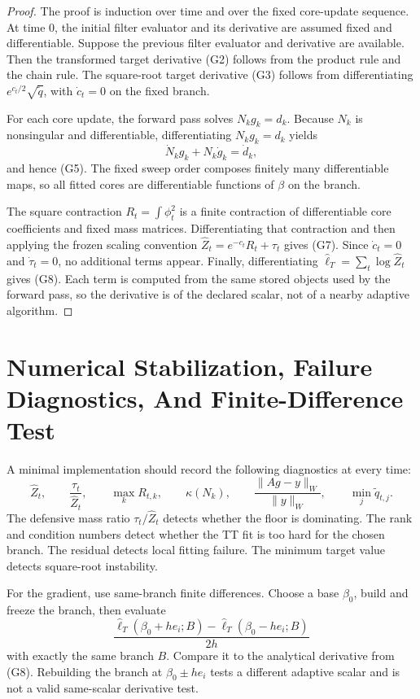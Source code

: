 \documentclass[11pt]{article}
\begin{document}
\begin{proof}
The proof is induction over time and over the fixed core-update sequence.  At
time \(0\), the initial filter evaluator and its derivative are assumed fixed
and differentiable.  Suppose the previous filter evaluator and derivative are
available.  Then the transformed target derivative (G2) follows from the
product rule and the chain rule.  The square-root target derivative (G3)
follows from differentiating \(e^{c_t/2}\sqrt{\widetilde q}\), with
\(\dot c_t=0\) on the fixed branch.

For each core update, the forward pass solves \(N_k g_k=d_k\).  Because
\(N_k\) is nonsingular and differentiable, differentiating
\(N_k g_k=d_k\) yields
\[
    \dot N_k g_k+N_k\dot g_k=\dot d_k,
\]
and hence (G5).  The fixed sweep order composes finitely many differentiable
maps, so all fitted cores are differentiable functions of \(\beta\) on the
branch.

The square contraction \(R_t=\int\phi_t^2\) is a finite contraction of
differentiable core coefficients and fixed mass matrices.  Differentiating that
contraction and then applying the frozen scaling convention
\(\widehat Z_t=e^{-c_t}R_t+\tau_t\) gives (G7).  Since
\(\dot c_t=0\) and \(\dot\tau_t=0\), no additional terms appear.  Finally,
differentiating
\(\widehat\ell_T=\sum_t\log\widehat Z_t\) gives (G8).  Each term is computed
from the same stored objects used by the forward pass, so the derivative is of
the declared scalar, not of a nearby adaptive algorithm.
\end{proof}

\section{Numerical Stabilization, Failure Diagnostics, And Finite-Difference Test}

A minimal implementation should record the following diagnostics at every time:
\[
    \widehat Z_t,\qquad
    \frac{\tau_t}{\widehat Z_t},\qquad
    \max_k R_{t,k},\qquad
    \kappa(N_k),\qquad
    \frac{\|A g-y\|_W}{\|y\|_W},\qquad
    \min_j \widetilde q_{t,j}.
\]
The defensive mass ratio \(\tau_t/\widehat Z_t\) detects whether the floor is
dominating.  The rank and condition numbers detect whether the TT fit is too
hard for the chosen branch.  The residual detects local fitting failure.  The
minimum target value detects square-root instability.

For the gradient, use same-branch finite differences.  Choose a base
\(\beta_0\), build and freeze the branch, then evaluate
\[
    \frac{\widehat\ell_T(\beta_0+h e_i;B)
    -
    \widehat\ell_T(\beta_0-h e_i;B)}
    {2h}
\]
with exactly the same branch \(B\).  Compare it to the analytical derivative
from (G8).  Rebuilding the branch at \(\beta_0\pm h e_i\) tests a different
adaptive scalar and is not a valid same-scalar derivative test.
\end{document}
